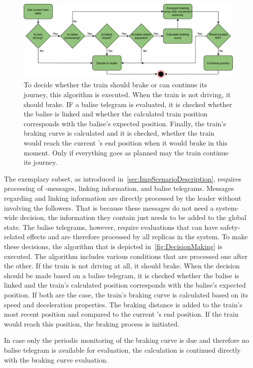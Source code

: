 \begin{figure}[!hb]
	\centering
	\includegraphics[width=0.75\linewidth]{images/DecisionMaking}
	\caption{To decide whether the train should brake or can continue its journey, this algorithm is executed. When the train is not driving, it should brake. IF a balise telegram is evaluated, it is checked whether the balise is linked and whether the calculated train position corresponds with the balise's expected position. Finally, the train's braking curve is calculated and it is checked, whether the train would reach the current 's end position when it would brake in this moment. Only if everything goes as planned may the train continue its journey.}
	\label{fig:DecisionMaking}
\end{figure}

The exemplary  subset, as introduced in~\autoref{sec:ImpScenarioDescription}, requires processing of -messages, linking information, and balise telegrams.
Messages regarding  and linking information are directly processed by the leader without involving the followers.
That is because these messages do not need a system-wide decision, the information they contain just needs to be added to the global state.
The balise telegrams, however, require evaluations that can have safety-related effects and are therefore processed by all replicas in the system.
To make these decisions, the algorithm that is depicted in~\autoref{fig:DecisionMaking} is executed.
The algorithm includes various conditions that are processed one after the other.
If the train is not driving at all, it should brake.
When the decision should be made based on a balise telegram, it is checked whether the balise is linked and the train's calculated position corresponds with the balise's expected position.
If both are the case, the train's braking curve is calculated based on its speed and deceleration properties.
The braking distance is added to the train's most recent position and compared to the current 's end position.
If the train would reach this position, the braking process is initiated.

In case only the periodic monitoring of the braking curve is due and therefore no balise telegram is available for evaluation, the calculation is continued directly with the braking curve evaluation.

